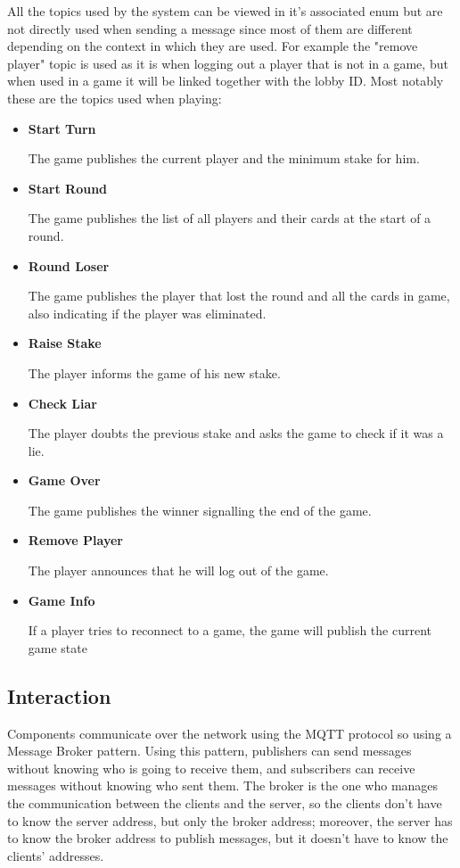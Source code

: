 \documentclass{scrartcl}
\begin{document}
All the topics used by the system can be viewed in it's associated enum but are not directly
used when sending a message since most of them are different depending on the context in which they are used.
For example the "remove player" topic is used as it is when logging out a player that is not
in a game, but when used in a game it will be linked together with the lobby ID.
Most notably these are the topics used when playing:
\begin{itemize}
      \item \textbf{Start Turn} \par
            The game publishes the current player and the minimum stake for him.
      \item \textbf{Start Round} \par
            The game publishes the list of all players and their cards at the start of a round.
      \item \textbf{Round Loser} \par
            The game publishes the player that lost the round and all the cards in game,
            also indicating if the player was eliminated.
      \item \textbf{Raise Stake} \par
            The player informs the game of his new stake.
      \item \textbf{Check Liar} \par
            The player doubts the previous stake and asks the game to check if it was a lie.
      \item \textbf{Game Over} \par
            The game publishes the winner signalling the end of the game.
      \item \textbf{Remove Player} \par
            The player announces that he will log out of the game.
      \item \textbf{Game Info} \par
            If a player tries to reconnect to a game, the game will publish the current game state
\end{itemize}

\subsection{Interaction}\label{interaction}
Components communicate over the network using the MQTT protocol so using a Message Broker pattern.
Using this pattern, publishers can send messages without knowing who is going to receive them, and
subscribers can receive messages without knowing who sent them.
The broker is the one who manages the communication between the clients and the server, so the clients
don't have to know the server address, but only the broker address; moreover, the server has
to know the broker address to publish messages, but it doesn't have to know the clients' addresses.
\end{document}
